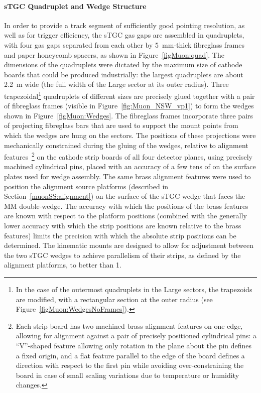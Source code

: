 \documentclass[cernpreprint, atlasdraft=false, UKenglish,british,orcidlogo, texmf, orcidlogo]{atlasdoc}
\begin{document}
\paragraph{sTGC Quadruplet and Wedge Structure \label{par:sTGCwedgestruct}}
In order to provide a track segment of sufficiently good pointing resolution, as well as for trigger efficiency, the \gls{sTGC} gas gaps are assembled in quadruplets, with four gas gaps separated from each other by \SI{5}{\mm}-thick fibreglass frames and paper honeycomb spacers, as shown in Figure~\ref{figMuon:quad}.
The dimensions of the quadruplets were dictated by the maximum size of cathode boards that could be produced industrially: the largest quadruplets are about \SI{2.2}{\m} wide (the full width of the Large sector at its outer radius).
Three trapezoidal\footnote{In the case of the outermost quadruplets in the Large sectors, the trapezoids are modified, with a rectangular section at the outer radius (see Figure~\ref{figMuon:WedgesNoFrames}).} quadruplets of different sizes are precisely glued together with a pair of fibreglass frames (visible in Figure~\ref{fig:Muon_NSW_vp1}) to form the wedges shown in Figure~\ref{figMuon:Wedges}. The fibreglass frames incorporate three pairs of projecting fibreglass bars that are used to support the mount points from which the wedges are hung on the sectors.  The positions of these projections were mechanically constrained during the gluing of the wedges,
relative to alignment features~\footnote{Each strip board has two machined brass alignment features on one edge, allowing for alignment against a pair of precisely positioned cylindrical pins: a ``V''-shaped feature allowing only rotation in the plane about the pin defines a fixed origin, and a flat feature parallel to the edge of the board defines a direction with respect to the first pin while avoiding over-constraining the board in case of small scaling variations due to temperature or humidity changes.} on the cathode strip boards of all four detector planes, using precisely machined cylindrical pins, placed with an accuracy of a few tens of \si{\micron} on the surface plates used for wedge assembly.
The same brass alignment features were used to position the alignment source platforms  (described in Section~\ref{muonSS:alignment}) on the surface of the \gls{sTGC} wedge that faces the \gls{MM} double-wedge. The accuracy with which the positions of the brass features are known with respect to the platform positions (combined with the generally lower accuracy with which the strip positions are known relative to the brass features) limits the precision with which the absolute strip positions can be determined.
The kinematic mounts are designed to allow for adjustment between the two \gls{sTGC} wedges to achieve parallelism of their strips, as defined by the alignment platforms, to better than \SI{1}{\mrad}.
 
\end{document}
